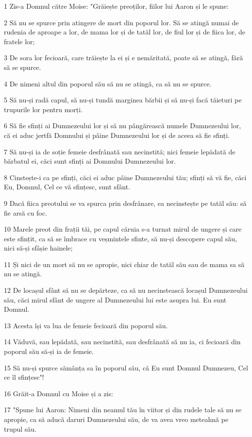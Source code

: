\par 1 Zis-a Domnul către Moise: "Grăiește preoților, fiilor lui Aaron și le spune:
\par 2 Să nu se spurce prin atingere de mort din poporul lor. Să se atingă numai de rudenia de aproape a lor, de mama lor și de tatăl lor, de fiul lor și de fiica lor, de fratele lor;
\par 3 De sora lor fecioară, care trăiește la ei și e nemăritată, poate să se atingă, fără să se spurce.
\par 4 De nimeni altul din poporul său să nu se atingă, ca să nu se spurce.
\par 5 Să nu-și radă capul, să nu-și tundă marginea bărbii și să nu-și facă tăieturi pe trupurile lor pentru morți.
\par 6 Să fie sfinți ai Dumnezeului lor și să nu pângărească numele Dumnezeului lor, că ei aduc jertfă Domnului și pâine Dumnezeului lor și de aceea să fie sfinți.
\par 7 Să nu-și ia de soție femeie desfrânată sau necinstită; nici femeie lepădată de bărbatul ei, căci sunt sfinți ai Domnului Dumnezeului lor.
\par 8 Cinstește-i ca pe sfinți, căci ei aduc pâine Dumnezeului tău; sfinți să vă fie, căci Eu, Domnul, Cel ce vă sfințesc, sunt sfânt.
\par 9 Dacă fiica preotului se va spurca prin desfrânare, ea necinstește pe tatăl său: să fie arsă cu foc.
\par 10 Marele preot din frații tăi, pe capul căruia s-a turnat mirul de ungere și care este sfințit, ca să se îmbrace cu veșmintele sfinte, să nu-și descopere capul său, nici să-și sfâșie hainele;
\par 11 Și nici de un mort să nu se apropie, nici chiar de tatăl său sau de mama sa să nu se atingă.
\par 12 De locașul sfânt să nu se depărteze, ca să nu necinstească locașul Dumnezeului său, căci mirul sfânt de ungere al Dumnezeului lui este asupra lui. Eu sunt Domnul.
\par 13 Acesta își va lua de femeie fecioară din poporul său.
\par 14 Văduvă, sau lepădată, sau necinstită, sau desfrânată să nu ia, ci fecioară din poporul său să-și ia de femeie.
\par 15 Să nu-și spurce sămânța sa în poporul său, că Eu sunt Domnul Dumnezeu, Cel ce îl sfințesc"!
\par 16 Grăit-a Domnul cu Moise și a zis:
\par 17 "Spune lui Aaron: Nimeni din neamul tău în viitor și din rudele tale să nu se apropie, ca să aducă daruri Dumnezeului său, de va avea vreo meteahnă pe trupul său.
